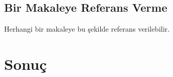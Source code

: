 \documentclass[12pt, a4paper]{article}
\begin{document}
\subsection{Bir Makaleye Referans Verme}
Herhangi bir makaleye \cite{als} bu şekilde referans verilebilir.

\newpage
\section{Sonuç}

\newpage
{}
%


\end{document}
